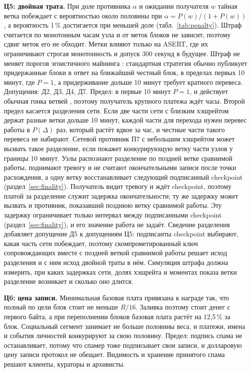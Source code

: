 \documentclass[10pt,a4paper]{article}
\begin{document}
\textbf{Ц5: двойная трата.}
При доле противника $\alpha$ и ожидании получателя $w$ тайная ветка побеждает с вероятностью около половины при $\alpha=P(w)/(1+P(w))$, а вероятность 1\,\% достигается при меньшей доле (табл.~\ref{tab:penalty}).
Штраф считается по монотонным часам узла и от меток блоков не зависит, поэтому сдвиг меток его не обходит.
Метки влияют только на ASERT, где их ограничивают строгая монотонность и допуск 300 секунд в будущее.
Штраф не меняет порогов эгоистичного майнинга \cite{selfish}: стандартная стратегия обычно публикует придержанные блоки в ответ на ближайший честный блок, в пределах первых 10 минут, где $P=1$, а придерживание дольше 10 минут требует кратного перевеса.
Допущения: Д2, Д3, Д4, Д7.
Предел: в первые 10 минут $P=1$, и действует обычная гонка ветвей \cite{rosenfeld}, поэтому получатель крупного платежа ждёт часы.
Второй предел касается разделения сети.
Если две части сети с близким хэшрейтом держат разные ветки дольше 10 минут, каждой части для перехода нужен перевес работы в $P(\Delta)$ раз, который растёт вдвое за час, и честные части такого перевеса не набирают.
Сетевой противник П7 с небольшим хэшрейтом может вызвать такое разделение, если покажет конкурирующую ветку части узлов у границы 10 минут.
Узлы распознают разделение по поздней ветке сравнимой работы, поднимают тревогу и не считают окончательными записи после точки расхождения, а одну ветку восстанавливает следующий подписанный checkpoint (раздел~\ref{sec:finality}).
Получатель видит тревогу и ждёт checkpoint, поэтому платой за разделение служит задержка окончательности; ту же задержку может вызвать и противник, показавший позднюю ветку сравнимой работы.
Эту задержку ограничивает только интервал между подписанными checkpoint (раздел~\ref{sec:finality}), и его значение работа не задаёт.
Сведение разделения добавляет допущение Д5 к допущениям Ц5: подписанты checkpoint выбирают, какая часть сети побеждает, поэтому скомпрометированный ключ сопровождающих вместе с поздней веткой сравнимой работы решает исход разделения и с ним исход двойной траты в нём.
Симуляция штрафа должна измерить, при каких задержках сети, долях хэшрейта и моментах показа ветки разделение возникает и сколько оно длится.

\textbf{Ц6: цена записи.}
Минимальная базовая плата привязана к награде так, что полный по цели блок стоит не меньше $R/16$.
Заливка поэтому стоит денег с первого байта, а при переполнении блоков базовая плата растёт на 12,5\,\% за блок.
Социальный сегмент занимает не больше половины веса, и платежи, имена и события личностей конкурируют за свою половину.
Предел: подпись спама не останавливает, потому что спамер тоже подписывает свои записи, и долларовую цену записи протокол не обещает.
Видимость и хранение принятого спама решают клиенты, кураторы и архивисты.
\end{document}
